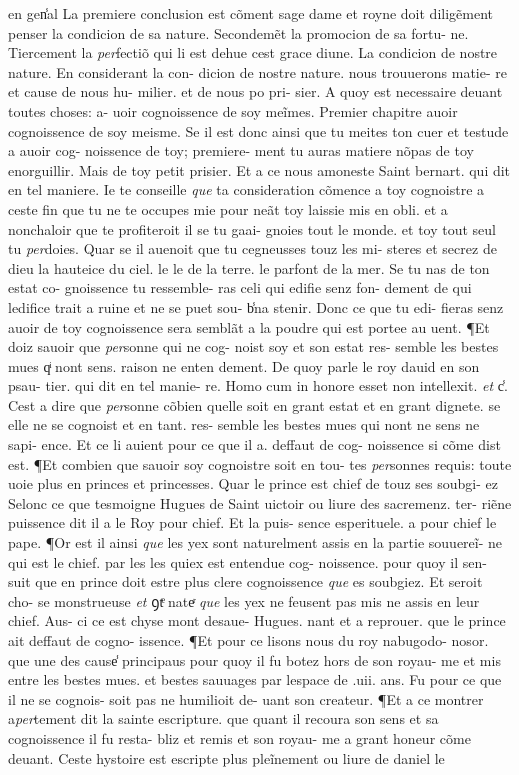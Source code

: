 \documentclass{article}
\begin{document}
\begin{pages}
en gen̾al La premiere conclusion est cõment sage dame et royne doit diligẽment penser la condicion de sa nature. Secondemẽt la promocion de sa fortu- ne. Tiercement la \textit{per}fectiõ qui li est dehue cest grace diune. La condicion de nostre nature. En considerant la con- dicion de nostre nature. nous trouuerons matie- re et cause de nous hu- milier. et de nous po pri- sier. A quoy est necessaire deuant toutes choses: a- uoir cognoissence de soy meĩmes. Premier chapitre auoir cognoissence de soy meisme. Se il est donc ainsi que tu meites ton cuer et testude a auoir cog- noissence de toy; premiere- ment tu auras matiere nõpas de toy enorguillir. Mais de toy petit prisier. Et a ce nous amoneste Saint bernart. qui dit en tel maniere. Ie te conseille \textit{que} ta consideration cõmence a toy cognoistre a ceste fin que tu ne te occupes mie pour neãt toy laissie mis en obli. et a nonchaloir que te profiteroit il se tu gaai- gnoies tout le monde. et toy tout seul tu \textit{per}doies. Quar se il auenoit que tu cegneusses touz les mi- steres et secrez de dieu la hauteice du ciel. le le de la terre. le parfont de la mer. Se tu nas de ton estat co- gnoissence tu ressemble- ras celi qui edifie senz fon- dement de qui ledifice trait a ruine et ne se puet sou- b̾na stenir. Donc ce que tu edi- fieras senz auoir de toy cognoissence sera semblãt a la poudre qui est portee au uent. ¶Et doiz sauoir que \textit{per}sonne qui ne cog- noist soy et son estat res- semble les bestes mues qͥ nont sens. raison ne enten dement. De quoy parle le roy dauid en son psau- tier. qui dit en tel manie- re. Homo cum in honore esset non intellexit. \textit{et} c̾. Cest a dire que \textit{per}sonne cõbien quelle soit en grant estat et en grant dignete. se elle ne se cognoist et en tant. res- semble les bestes mues qui nont ne sens ne sapi- ence. Et ce li auient pour ce que il a. deffaut de cog- noissence si cõme dist est. ¶Et combien que sauoir soy cognoistre soit en tou- tes \textit{per}sonnes requis: toute uoie plus en princes et princesses. Quar le prince est chief de touz ses soubgi- ez Selonc ce que tesmoigne Hugues de Saint uictoir ou liure des sacremenz. ter- riẽne puissence dit il a le Roy pour chief. Et la puis- sence esperituele. a pour chief le pape. ¶Or est il ainsi \textit{que} les yex sont naturelment assis en la partie souuereĩ- ne qui est le chief. par les les quiex est entendue cog- noissence. pour quoy il sen- suit que en prince doit estre plus clere cognoissence \textit{que} es soubgiez. Et seroit cho- se monstrueuse \textit{et} ꝯtͤ nateͬ \textit{que} les yex ne feusent pas mis ne assis en leur chief. Aus- ci ce est chyse mont desaue- Hugues. nant et a reprouer. que le prince ait deffaut de cogno- issence. ¶Et pour ce lisons nous du roy nabugodo- nosor. que une des cause̾ principaus pour quoy il fu botez hors de son royau- me et mis entre les bestes mues. et bestes sauuages par lespace de .uii. ans. Fu pour ce que il ne se cognois- soit pas ne humilioit de- uant son createur. ¶Et a ce montrer a\textit{per}tement dit la sainte escripture. que quant il recoura son sens et sa cognoissence il fu resta- bliz et remis et son royau- me a grant honeur cõme deuant. Ceste hystoire est escripte plus pleĩnement ou liure de daniel le 
\end{pages}
\end{document}
